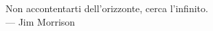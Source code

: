 
\cleardoublepage
{}
\thispagestyle{empty}

\vspace*{3cm}

\begin{center}
Non accontentarti dell’orizzonte, cerca l’infinito. \\ \medskip
--- Jim Morrison
\end{center}

\medskip

